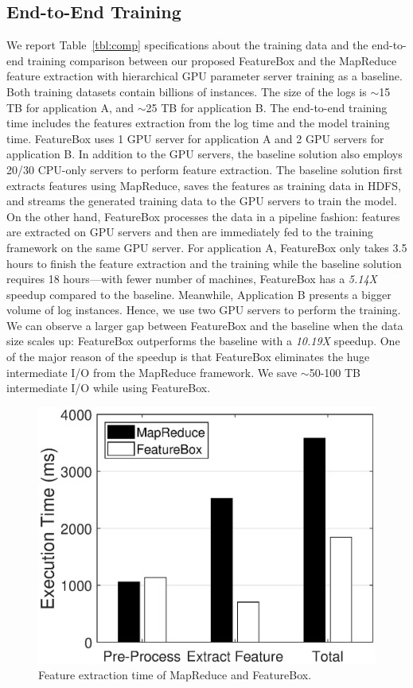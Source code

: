 \documentclass[conference]{IEEEtran}
\begin{document}
\subsection{End-to-End Training }
We report Table~\ref{tbl:comp} specifications about the training data and the end-to-end training comparison between our proposed FeatureBox and the MapReduce feature extraction with hierarchical GPU parameter server training as a baseline. Both training datasets contain billions of instances. The size of the logs is $\sim$15 TB for application A, and $\sim$25 TB for application B. The end-to-end training time includes the features extraction from the log time and the model training time. FeatureBox uses 1 GPU server for application A and 2 GPU servers for application B. In addition to the GPU servers, the baseline solution also employs 20/30 CPU-only servers to perform feature extraction. The baseline solution first extracts features using MapReduce, saves the features as training data in HDFS, and streams the generated training data to the GPU servers to train the model. On the other hand, FeatureBox processes the data in a pipeline fashion: features are extracted on GPU servers and then are immediately fed to the training framework on the same GPU server. For application A, FeatureBox only takes 3.5 hours to finish the feature extraction and the training while the baseline solution requires 18 hours---with fewer number of machines, FeatureBox has a \emph{5.14X} speedup compared to the baseline. 
Meanwhile, Application B presents a bigger volume of log instances. Hence, we use two GPU servers to perform the training. We can observe a larger gap between FeatureBox and the baseline when the data size scales up: FeatureBox outperforms the baseline with a \emph{10.19X} speedup. One of the major reason of the speedup is that FeatureBox eliminates the huge intermediate I/O from the MapReduce framework. 
We save $\sim$50-100 TB intermediate I/O while using FeatureBox.


\begin{figure}[htbp]
\centering
\includegraphics[width=.38\textwidth]{figs/featureextract}
\caption{Feature extraction time of MapReduce and FeatureBox.}
\label{fig:extract}
\end{figure}
\end{document}
